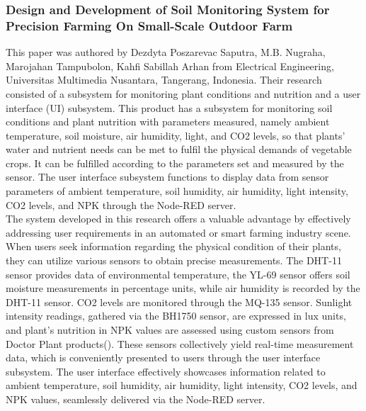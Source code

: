 \documentclass[12pt, a4paper]{article}
\begin{document}
\subsubsection{Design and Development of Soil Monitoring System for Precision Farming On Small-Scale Outdoor Farm}
This paper was authored by Dezdyta Poszarevac Saputra, M.B. Nugraha, Marojahan Tampubolon, Kahfi Sabillah Arhan \cite{10435334} from Electrical Engineering, Universitas Multimedia Nusantara, Tangerang, Indonesia.
Their research consisted of a subsystem for monitoring plant conditions and nutrition and a user interface (UI) subsystem. This product has a subsystem for monitoring soil conditions and plant nutrition with parameters measured, namely ambient temperature, soil moisture, air humidity, light, and CO2 levels, so that plants’ water and nutrient needs can be met to fulfil the physical demands of vegetable crops. It can be fulfilled according to the parameters set and measured by the sensor. The user interface subsystem functions to display data from sensor parameters of ambient temperature, soil humidity, air humidity, light intensity, CO2 levels, and NPK through the Node-RED server.\\
The system developed in this research offers a valuable advantage by effectively addressing user requirements in an automated or smart farming industry scene. When users seek information regarding the physical condition of their plants, they can utilize various sensors to obtain precise measurements. The DHT-11 sensor provides data of environmental temperature, the YL-69 sensor offers soil moisture measurements in percentage units, while air humidity is recorded by the DHT-11 sensor. CO2 levels are monitored through the MQ-135 sensor. Sunlight intensity readings, gathered via the BH1750 sensor, are expressed in lux units, and plant’s nutrition in NPK values are assessed using custom sensors from Doctor Plant products(). These sensors collectively yield real-time measurement data, which is conveniently presented to users through the user interface subsystem. The user interface effectively showcases information related to ambient temperature, soil humidity, air humidity, light intensity, CO2 levels, and NPK values, seamlessly delivered via the Node-RED server.
\end{document}
